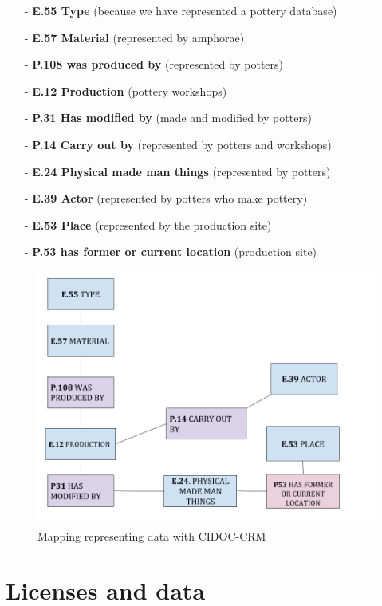 \documentclass[10pt,a4paper]{article}
\begin{document}
\begin{itemize}
\item[-] \textbf{E.55 Type} (because we have represented a pottery database)
\item[-] \textbf{E.57 Material} (represented by amphorae)
\item[-] \textbf{P.108 was produced by} (represented by potters)
\item[-] \textbf{E.12 Production} (pottery workshops)
\item[-] \textbf{P.31 Has modified by} (made and modified by potters)
\item[-] \textbf{P.14 Carry out by} (represented by potters and workshops)
\item[-] \textbf{E.24 Physical made man things} (represented by potters)
\item[-] \textbf{E.39 Actor} (represented by potters who make pottery)
\item[-] \textbf{E.53 Place} (represented by the production site)
\item[-] \textbf{P.53 has former or current location} (production site)
\end{itemize}


\begin{figure}[htp]
\centering
\includegraphics[scale=0.40]{sparex.png}
\caption{Mapping representing data with CIDOC-CRM}
\label{sparex}
\end{figure}


\newpage


\section{Licenses and data}
\end{document}
